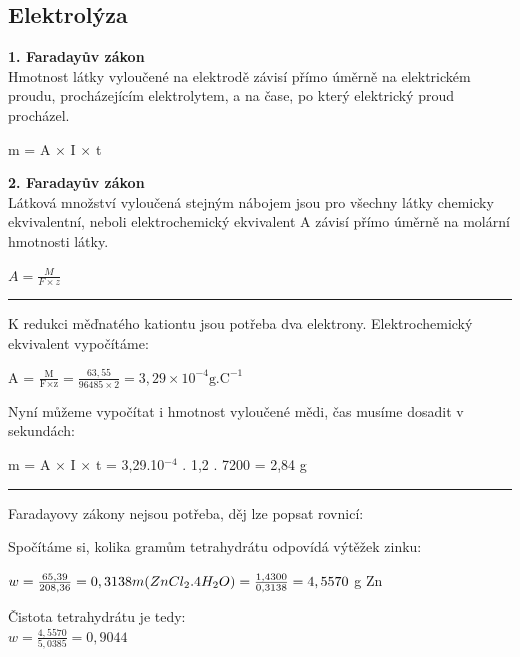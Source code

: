 \clearpage

\subsection{Elektrolýza}

\textbf{1. Faradayův zákon}\\
Hmotnost látky vyloučené na elektrodě závisí přímo úměrně na elektrickém proudu, procházejícím elektrolytem, a na čase, po který elektrický proud procházel.

m = A $\times$ I $\times$ t

\textbf{2. Faradayův zákon}\\
Látková množství vyloučená stejným nábojem jsou pro všechny látky chemicky ekvivalentní, neboli elektrochemický ekvivalent A závisí přímo úměrně na molární hmotnosti látky.

$A = \frac{M}{F \times z}$ \\

\hrule
{}

K redukci měďnatého kationtu jsou potřeba dva elektrony. Elektrochemický ekvivalent vypočítáme:

A = $\frac{\textrm{M}}{\textrm{F}\times\textrm{z}} = \frac{63,55}{96 485 \times 2} = 3,29\times10^{-4} \textrm{g.C}^{-1}$

Nyní můžeme vypočítat i hmotnost vyloučené mědi, čas musíme dosadit v sekundách:

m = A $\times$ I $\times$ t = 3,29.10$^{-4}$ . 1,2 . 7200 = 2,84 g


\hrule


Faradayovy zákony nejsou potřeba, děj lze popsat rovnicí:\\

Spočítáme si, kolika gramům tetrahydrátu odpovídá výtěžek zinku:

$w = \frac{65,39}{208,36} = 0,3138\\
m(ZnCl_2.4H_2O) = \frac{1,4300}{0,3138} = 4,5570$ g Zn

Čistota tetrahydrátu je tedy:\\
$w = \frac{4,5570}{5,0385} = 0,9044$

